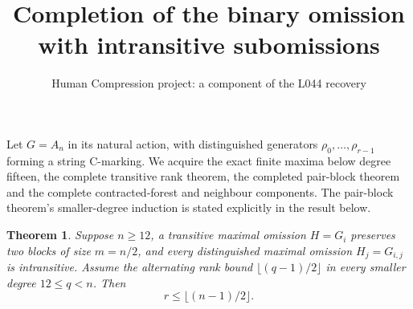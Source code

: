 \documentclass[11pt,a4paper]{article}
\title{Completion of the binary omission with intransitive subomissions}
\author{Human Compression project: a component of the L044 recovery}
\date{}
\newtheorem{theorem}{Theorem}
\begin{document}
\maketitle
Let $G=A_n$ in its natural action, with distinguished generators
$\rho_0,\ldots,\rho_{r-1}$ forming a string C-marking. We acquire
the exact finite maxima below degree fifteen, the complete transitive
rank theorem, the completed pair-block theorem and the complete
contracted-forest and neighbour components. The pair-block theorem's
smaller-degree induction is stated explicitly in the result below.

\begin{theorem}
Suppose $n\ge12$, a transitive maximal omission $H=G_i$
preserves two blocks of size $m=n/2$, and every distinguished
maximal omission $H_j=G_{i,j}$ is intransitive. Assume the
alternating rank bound $\lfloor(q-1)/2\rfloor$ in every smaller
degree $12\le q<n$. Then
\[
                       r\le\lfloor(n-1)/2\rfloor.
\]
\end{theorem}
\end{document}
